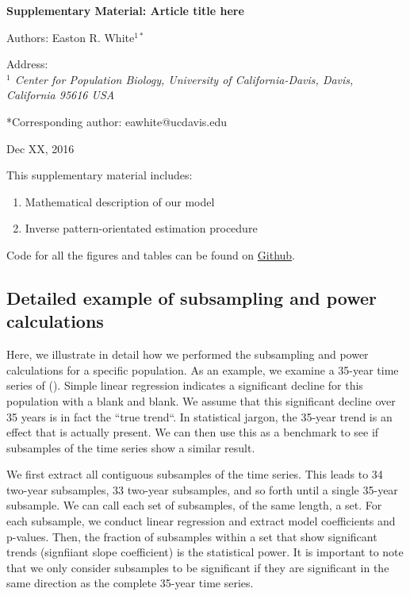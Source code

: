 \documentclass[12pt,]{article}
\title{}
\author{}
\date{}
\providecommand{\tightlist}{%
  \setlength{\itemsep}{0pt}\setlength{\parskip}{0pt}}
\begin{document}
\vspace{2cm}

\begin{center}
 \textbf{Supplementary Material: Article title here}
 
Authors: Easton R. White$^{1*}$
\vspace{3 mm}

Address: \\ \emph{$^1$ Center for Population Biology, University of California-Davis, Davis, California 95616 USA}

*Corresponding author: eawhite@ucdavis.edu

Dec XX, 2016
 \end{center}

\vspace{2cm}

This supplementary material includes:

\begin{enumerate}
\def\labelenumi{\arabic{enumi}.}
\tightlist
\item
  Mathematical description of our model
\item
  Inverse pattern-orientated estimation procedure
\end{enumerate}

Code for all the figures and tables can be found on
\href{https://github.com/erwhite1}{Github}.

\vspace{2cm}

\subsection{Detailed example of subsampling and power
calculations}\label{detailed-example-of-subsampling-and-power-calculations}

Here, we illustrate in detail how we performed the subsampling and power
calculations for a specific population. As an example, we examine a
35-year time series of (). Simple linear regression indicates a
significant decline for this population with a blank and blank. We
assume that this significant decline over 35 years is in fact the ``true
trend``. In statistical jargon, the 35-year trend is an effect that is
actually present. We can then use this as a benchmark to see if
subsamples of the time series show a similar result.

We first extract all contiguous subsamples of the time series. This
leads to 34 two-year subsamples, 33 two-year subsamples, and so forth
until a single 35-year subsample. We can call each set of subsamples, of
the same length, a set. For each subsample, we conduct linear regression
and extract model coefficients and p-values. Then, the fraction of
subsamples within a set that show significant trends (signfiiant slope
coefficient) is the statistical power. It is important to note that we
only consider subsamples to be significant if they are significant in
the same direction as the complete 35-year time series.
\end{document}
